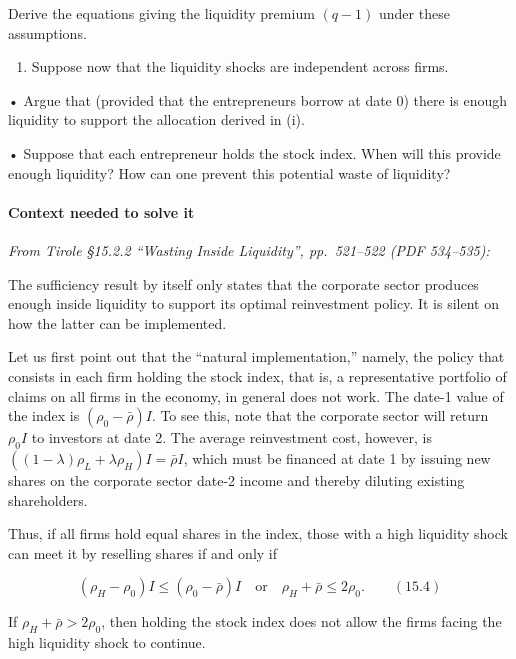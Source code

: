 \documentclass[11pt,a4paper]{article}
\providecommand{\tightlist}{\setlength{\itemsep}{0pt}\setlength{\parskip}{0pt}}
\begin{document}
Derive the equations giving the liquidity premium \((q - 1)\) under these assumptions.

\begin{enumerate}
\def\labelenumi{(\roman{enumi})}
\setcounter{enumi}{2}
\tightlist
\item
  Suppose now that the liquidity shocks are independent across firms.
\end{enumerate}

• Argue that (provided that the entrepreneurs borrow at date 0) there is enough liquidity to support
the allocation derived in (i).

• Suppose that each entrepreneur holds the stock index. When will this provide enough liquidity? How
can one prevent this potential waste of liquidity?

\paragraph{Context needed to solve it}

\emph{From Tirole §15.2.2 ``Wasting Inside Liquidity'', pp.~521--522 (PDF 534--535):}

The sufficiency result by itself only states that the corporate sector produces enough inside
liquidity to support its optimal reinvestment policy. It is silent on how the latter can be
implemented.

Let us first point out that the ``natural implementation,'' namely, the policy that consists in each
firm holding the stock index, that is, a representative portfolio of claims on all firms in the
economy, in general does not work. The date-1 value of the index is \((\rho_0 - \bar\rho)I\). To see
this, note that the corporate sector will return \(\rho_0 I\) to investors at date 2. The average
reinvestment cost, however, is \(((1 - \lambda)\rho_L + \lambda\rho_H)I = \bar\rho I\), which must
be financed at date 1 by issuing new shares on the corporate sector date-2 income and thereby
diluting existing shareholders.

Thus, if all firms hold equal shares in the index, those with a high liquidity shock can meet it by
reselling shares if and only if

\[(\rho_H - \rho_0)I \leqslant (\rho_0 - \bar\rho)I \quad\text{or}\quad \rho_H + \bar\rho \leqslant 2\rho_0. \qquad (15.4)\]

If \(\rho_H + \bar\rho > 2\rho_0\), then holding the stock index does not allow the firms facing the
high liquidity shock to continue.
\end{document}
